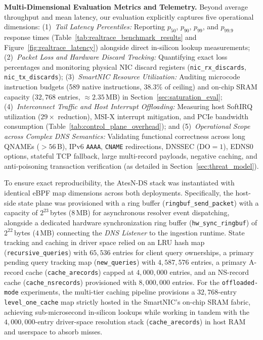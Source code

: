 \documentclass[a4paper,fleqn,colorlinks,hidelinks]{cas-sc}
\begin{document}
\textbf{Multi-Dimensional Evaluation Metrics and Telemetry.} Beyond average throughput and mean latency, our evaluation explicitly captures five operational dimensions:
(1)~\textit{Tail Latency Percentiles:} Reporting $p_{50}$, $p_{90}$, $p_{99}$, and $p_{99.9}$ response times (Table~\ref{tab:realtrace_benchmark_results} and Figure~\ref{fig:realtrace_latency}) alongside direct in-silicon lookup measurements;
(2)~\textit{Packet Loss and Hardware Discard Tracking:} Quantifying exact loss percentages and monitoring physical NIC discard registers (\texttt{nic\_rx\_discards}, \texttt{nic\_tx\_discards});
(3)~\textit{SmartNIC Resource Utilization:} Auditing microcode instruction budgets (589 native instructions, $38.3\%$ of ceiling) and on-chip SRAM capacity ($32{,}768$ entries, $\approx 2.35$\,MB) in Section~\ref{sec:saturation_eval};
(4)~\textit{Interconnect Traffic and Host Interrupt Offloading:} Measuring host SoftIRQ utilization ($29\times$ reduction), MSI-X interrupt mitigation, and PCIe bandwidth consumption (Table~\ref{tab:control_plane_overhead}); and
(5)~\textit{Operational Scope across Complex DNS Semantics:} Validating functional correctness across long QNAMEs ($>56$\,B), IPv6 \texttt{AAAA}, \texttt{CNAME} redirections, DNSSEC ($\text{DO}=1$), EDNS0 options, stateful TCP fallback, large multi-record payloads, negative caching, and anti-poisoning transaction verification (as detailed in Section~\ref{sec:threat_model}).

To ensure exact reproducibility, the AtesN-DS stack was instantiated with identical eBPF map dimensions across both deployments. Specifically, the host-side state plane was provisioned with a ring buffer (\texttt{ringbuf\_send\_packet}) with a capacity of $2^{23}$\,bytes ($8$\,MB) for asynchronous resolver event dispatching, alongside a dedicated hardware synchronization ring buffer (\texttt{hw\_sync\_ringbuf}) of $2^{22}$\,bytes ($4$\,MB) connecting the \textit{DNS Listener} to the ingestion runtime. State tracking and caching in driver space relied on an LRU hash map (\texttt{recursive\_queries}) with $65,536$ entries for client query ownerships, a primary pending query tracking map (\texttt{new\_queries}) with $4,587,576$ entries, a primary A-record cache (\texttt{cache\_arecords}) capped at $4,000,000$ entries, and an NS-record cache (\texttt{cache\_nsrecords}) provisioned with $8,000,000$ entries. For the \texttt{offloaded-mode} experiments, the multi-tier caching pipeline provisions a $32,768$-entry \texttt{level\_one\_cache} map strictly hosted in the SmartNIC's on-chip SRAM fabric, achieving sub-microsecond in-silicon lookups while working in tandem with the $4,000,000$-entry driver-space resolution stack (\texttt{cache\_arecords}) in host RAM and userspace to absorb misses.
\end{document}
